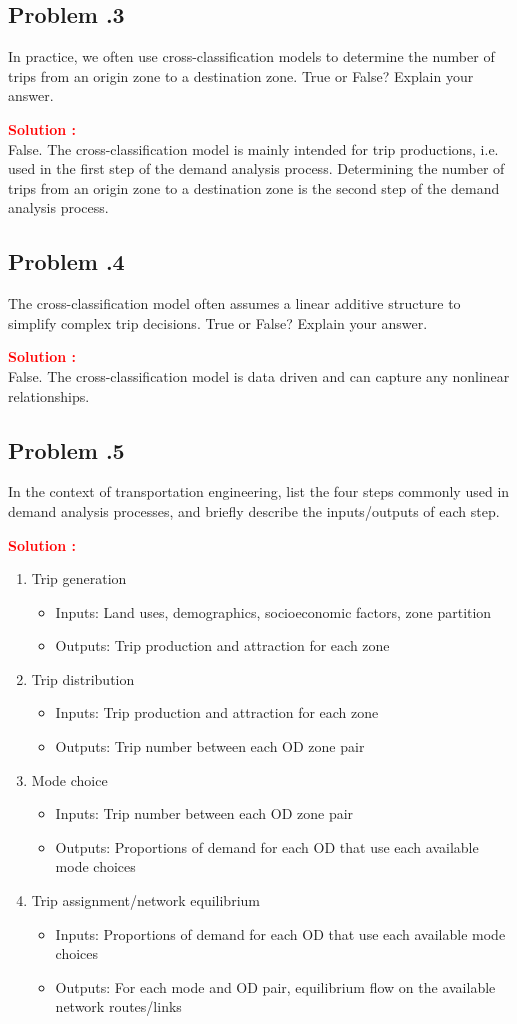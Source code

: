 \documentclass[12pt]{article}
\newcommand{\customsubsection}[1]{
  \subsection*{Problem \thesection.#1}
}
\begin{document}
\customsubsection{3}
In practice, we often use cross-classification models to determine the number of trips from an origin zone to a destination zone. True or False? Explain your answer. 


\textbf{\textcolor{red}{Solution :}} \\
False. The cross-classification model is mainly intended for trip productions, i.e. used in the first step of the demand analysis process. Determining the number of trips from an origin zone to a destination zone is the second step of the demand analysis process.

\newpage

\customsubsection{4}
The cross-classification model often assumes a linear additive structure to simplify complex trip decisions. True or False? Explain your answer. 


\textbf{\textcolor{red}{Solution :}} \\
False. The cross-classification model is data driven and can capture any nonlinear relationships.
\newpage

\customsubsection{5}
In the context of transportation engineering, list the four steps commonly used in demand analysis processes, and briefly describe the inputs/outputs of each step.


\textbf{\textcolor{red}{Solution :}} 
\begin{enumerate}
    \item Trip generation
    \begin{itemize}
        \item Inputs: Land uses, demographics, socioeconomic factors, zone partition 
        \item Outputs: Trip production and attraction for each zone
    \end{itemize}

\item Trip distribution
\begin{itemize}
    \item Inputs: Trip production and attraction for each zone
    \item Outputs: Trip number between each OD zone pair
\end{itemize}

\item Mode choice
\begin{itemize}
    \item Inputs: Trip number between each OD zone pair
    \item Outputs: Proportions of demand for each OD that use each available mode choices 
\end{itemize}

\item Trip assignment/network equilibrium
\begin{itemize}
    \item Inputs: Proportions of demand for each OD that use each available mode choices
    \item Outputs: For each mode and OD pair, equilibrium flow on the available network routes/links
\end{itemize}

\end{enumerate}
\newpage
\end{document}
